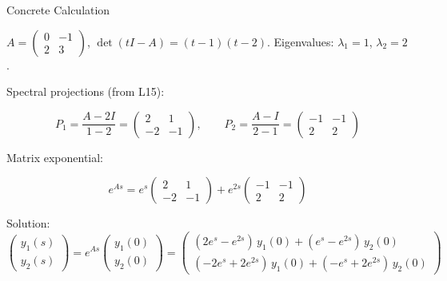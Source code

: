 \documentclass[10pt]{beamer}
\theoremstyle{definition}
\begin{document}
\begin{frame}[shrink=3]{Concrete Calculation}

$A = \begin{pmatrix}0&-1\\2&3\end{pmatrix}$, \; $\det(tI - A) = (t-1)(t-2)$. \; Eigenvalues: $\lambda_1 = 1$, $\lambda_2 = 2$.

\vfill\pause

Spectral projections (from L15):

$$P_1 = \frac{A-2I}{1-2} = \begin{pmatrix}2&1\\-2&-1\end{pmatrix}, \qquad P_2 = \frac{A-I}{2-1} = \begin{pmatrix}-1&-1\\2&2\end{pmatrix}$$

\vfill\pause

Matrix exponential:

$$e^{As} = e^{s}\begin{pmatrix}2&1\\-2&-1\end{pmatrix} + e^{2s}\begin{pmatrix}-1&-1\\2&2\end{pmatrix}$$

\vfill\pause

Solution:
$$\begin{pmatrix}y_1(s)\\y_2(s)\end{pmatrix} = e^{As}\begin{pmatrix}y_1(0)\\y_2(0)\end{pmatrix} = \begin{pmatrix}(2e^s - e^{2s})\,y_1(0) + (e^s - e^{2s})\,y_2(0) \\ (-2e^s + 2e^{2s})\,y_1(0) + (-e^s + 2e^{2s})\,y_2(0)\end{pmatrix}$$

\end{frame}
\end{document}
